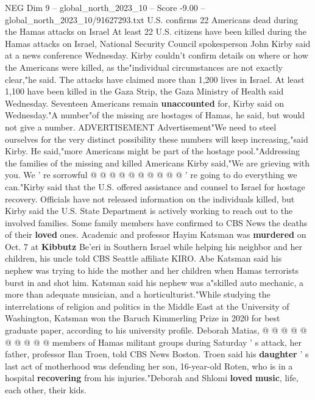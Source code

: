 \begin{textsample}{NEG Dim 9 – global\_north\_2023\_10 – Score -9.00 – global\_north\_2023\_10/91627293.txt}  \label{ex:f9_neg_037}
U.S. confirms 22 Americans dead during the Hamas attacks on Israel At least 22 U.S. citizens have been killed during the Hamas attacks on Israel, National Security Council spokesperson John Kirby said at a news conference Wednesday.
Kirby couldn't confirm details on where or how the Americans were killed, as the"individual circumstances are not exactly clear,"he said.
The attacks have claimed more than 1,200 lives in Israel.
At least 1,100 have been killed in the Gaza Strip, the Gaza Ministry of Health said Wednesday.
Seventeen Americans remain \textbf{unaccounted} for, Kirby said on Wednesday."A number"of the missing are hostages of Hamas, he said, but would not give a number.
ADVERTISEMENT Advertisement"We need to steel ourselves for the very distinct possibility these numbers will keep increasing,"said Kirby.
He said,"more Americans might be part of the hostage pool."Addressing the families of the missing and killed Americans Kirby said,"We are grieving with you.
We ' re sorrowful @ @ @ @ @ @ @ @ @ @ ' re going to do everything we can."Kirby said that the U.S. offered assistance and counsel to Israel for hostage recovery.
Officials have not released information on the individuals killed, but Kirby said the U.S.
State Department is actively working to reach out to the involved families.
Some family members have confirmed to CBS News the deaths of their \textbf{loved} ones.
Academic and professor Hayim Katsman was \textbf{murdered} on Oct. 7 at \textbf{Kibbutz} Be'eri in Southern Israel while helping his neighbor and her children, his uncle told CBS Seattle affiliate KIRO.
Abe Katsman said his nephew was trying to hide the mother and her children when Hamas terrorists burst in and shot him.
Katsman said his nephew was a"skilled auto mechanic, a more than adequate musician, and a horticulturist."While studying the interrelations of religion and politics in the Middle East at the University of Washington, Katsman won the Baruch Kimmerling Prize in 2020 for best graduate paper, according to his university profile.
Deborah Matias, @ @ @ @ @ @ @ @ @ @ members of Hamas militant groups during Saturday ' s attack, her father, professor Ilan Troen, told CBS News Boston.
Troen said his \textbf{daughter} ' s last act of motherhood was defending her son, 16-year-old Roten, who is in a hospital \textbf{recovering} from his injuries."Deborah and Shlomi \textbf{loved} \textbf{music}, life, each other, their kids.

\end{textsample}
